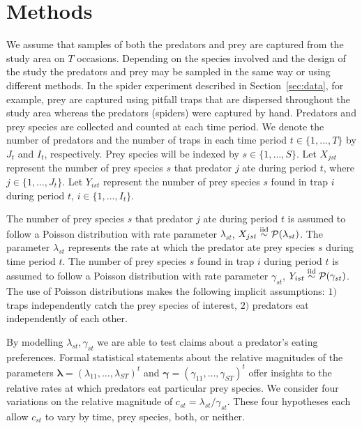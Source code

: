 \documentclass[smallextended]{svjour3}
\begin{document}
\section{Methods}
\label{sec:methods}

We assume that samples of both the predators and prey are captured from the study area on $T$ occasions.  Depending on the species involved and the design of the study the predators and prey may be sampled in the same way or using different methods.  In the spider experiment described in Section~\ref{sec:data}, for example, prey are captured using pitfall traps that are dispersed throughout the study area whereas the predators (spiders) were captured by hand.  Predators and prey species are collected and counted at each time period.  We denote the number of predators and the number of traps in each time period $t \in \{1, \ldots, T\}$ by $J_t$ and $I_t$, respectively.  Prey species will be indexed by $s \in \{1, \ldots, S \}$.  Let $X_{jst}$ represent the number of prey species $s$ that predator $j$ ate during period $t$, where $j \in \{1, \ldots, J_t\}$.  Let $Y_{ist}$ represent the number of prey species $s$ found in trap $i$ during period $t$, $i \in \{1, \ldots, I_t\}$.

The number of prey species $s$ that predator $j$ ate during period $t$ is assumed to follow a Poisson distribution with rate parameter $\lambda_{st}$, $X_{jst} \stackrel{\mathrm{iid}}{\sim} \mathcal{P}(\lambda_{st})$.  The parameter $\lambda_{st}$ represents the rate at which the predator ate prey species $s$ during time period $t$.  The number of prey species $s$ found in trap $i$ during period $t$ is assumed to follow a Poisson distribution with rate parameter $\gamma_{st}$, $Y_{ist} \stackrel{\mathrm{iid}}{\sim} \mathcal{P}(\gamma_{st})$.  The use of Poisson distributions makes the following implicit assumptions: $1)$ traps independently catch the prey species of interest, $2)$ predators eat independently of each other.  

By modelling $\lambda_{st}, \gamma_{st}$ we are able to test claims about a predator's eating preferences.  Formal statistical statements about the relative magnitudes of the parameters $\boldsymbol{\lambda} = (\lambda_{11}, \ldots, \lambda_{ST})^t$ and $\boldsymbol{\gamma} = (\gamma_{11}, \ldots, \gamma_{ST})^t$ offer insights to the relative rates at which predators eat particular prey species.  We consider four variations on the relative magnitude of $c_{st} = \lambda_{st}/\gamma_{st}$.  These four hypotheses each allow $c_{st}$ to vary by time, prey species, both, or neither.
\end{document}
